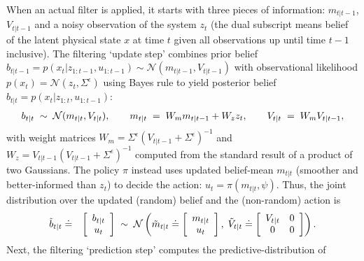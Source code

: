 \documentclass{article}
\newcommand{\N}{\mathcal{N}}
\newcommand{\pno}[1]{#1_{t|t-1}}   %
\newcommand{\uno}[1]{#1_{t|t}}     %
\newcommand{\unot}[1]{\tilde #1_{t|t}}     %
\newcommand{\pne}[1]{#1_{t+1|t}}   %
\newcommand{\now}[1]{#1_t}
\newcommand{\new}[1]{#1_{t+1}}
\newcommand{\bm}{m} %
\newcommand{\policyparams}{\psi} %
\begin{document}
When an actual filter is applied, it starts with three pieces of information:
$\pno{\bm}$, $\pno{V}$ and a noisy observation of the system
$\now{z}$
(the dual subscript means belief of the latent physical state $x$ at time $t$
given all observations up until time $t-1$ inclusive).
%
The filtering `update step' combines prior belief $\pno{b}=p(\now{x}|z_{1:t-1},u_{1:t-1})\sim\N(\pno{m},\pno{V})$
with observational likelihood $p(\now{x})=\N(\now{z},\Sigma^\epsilon)$ using Bayes rule
to yield posterior belief $\uno{b}=p(\now{x}|z_{1:t},u_{1:t-1})$:
\begin{eqnarray}
\uno{b}\;\sim\;{\cal N}(\uno{\bm},\uno{V}), \quad\quad
\uno{\bm}\;=\;W_\bm\pno{\bm}+W_z\now{z}, \quad\quad
\uno{V}\;=\;W_\bm\pno{V},
\end{eqnarray}
with weight matrices $W_\bm=\Sigma^\epsilon(\pno{V}+\Sigma^\epsilon)^{-1}$ and
$W_z=\pno{V}(\pno{V}+\Sigma^\epsilon)^{-1}$
computed from the standard result of a product of two Gaussians. %
%
The policy $\pi$
instead uses
updated belief-mean $\uno{\bm}$
(smoother and better-informed than $\now{z}$)
to decide the action:
$\now{u}=\pi(\uno{\bm},\policyparams)$.
Thus, the joint distribution over the
updated (random) belief and the (non-random) action is
\begin{eqnarray}
\unot{b}&\doteq&
\left[\begin{array}{c}\uno{b}\\\now{u}\end{array}\right]\;\sim\;{\cal N}\left(\unot{\bm}\doteq\left[\begin{array}{c}\uno{\bm}\\\now{u}\end{array}\right],\;
\unot{V}\doteq\left[\begin{array}{cc}\uno{V}&0\\0&0\end{array}
\right]\right).
\end{eqnarray}
Next, the filtering `prediction step' computes the predictive-distribution of \smash{$\pne{b}=p(\new{x}|z_{1:t},u_{1:t})$}
\end{document}

